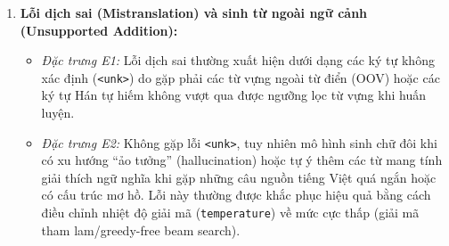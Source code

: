 \begin{enumerate}
    \item \textbf{Lỗi dịch sai (Mistranslation) và sinh từ ngoài ngữ cảnh (Unsupported Addition):}
    \begin{itemize}
        \item \textit{Đặc trưng E1:} Lỗi dịch sai thường xuất hiện dưới dạng các ký tự không xác định (\texttt{<unk>}) do gặp phải các từ vựng ngoài từ điển (OOV) hoặc các ký tự Hán tự hiếm không vượt qua được ngưỡng lọc từ vựng khi huấn luyện.
        \item \textit{Đặc trưng E2:} Không gặp lỗi \texttt{<unk>}, tuy nhiên mô hình sinh chữ đôi khi có xu hướng ``ảo tưởng'' (hallucination) hoặc tự ý thêm các từ mang tính giải thích ngữ nghĩa khi gặp những câu nguồn tiếng Việt quá ngắn hoặc có cấu trúc mơ hồ. Lỗi này thường được khắc phục hiệu quả bằng cách điều chỉnh nhiệt độ giải mã (\texttt{temperature}) về mức cực thấp (giải mã tham lam/greedy-free beam search).
    \end{itemize}
\end{enumerate}
